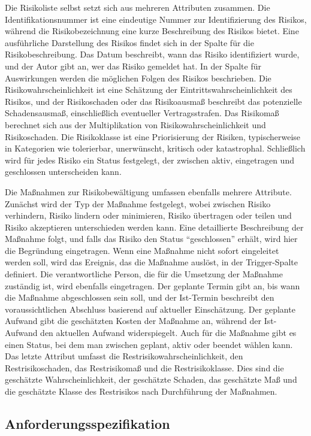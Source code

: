 Die Risikoliste selbst setzt sich aus mehreren Attributen zusammen. Die Identifikationsnummer ist eine eindeutige 
Nummer zur Identifizierung des Risikos, während die Risikobezeichnung eine kurze Beschreibung des Risikos bietet. 
Eine ausführliche Darstellung des Risikos findet sich in der Spalte für die Risikobeschreibung. Das Datum beschreibt, 
wann das Risiko identifiziert wurde, und der Autor gibt an, wer das Risiko gemeldet hat. In der Spalte für Auswirkungen 
werden die möglichen Folgen des Risikos beschrieben. Die Risikowahrscheinlichkeit ist eine Schätzung der 
Eintrittswahrscheinlichkeit des Risikos, und der Risikoschaden oder das Risikoausmaß beschreibt das potenzielle 
Schadensausmaß, einschließlich eventueller Vertragsstrafen. Das Risikomaß berechnet sich aus der Multiplikation von 
Risikowahrscheinlichkeit und Risikoschaden. Die Risikoklasse ist eine Priorisierung der Risiken, typischerweise in 
Kategorien wie tolerierbar, unerwünscht, kritisch oder katastrophal. Schließlich wird für jedes Risiko ein Status 
festgelegt, der zwischen aktiv, eingetragen und geschlossen unterscheiden kann.

Die Maßnahmen zur Risikobewältigung umfassen ebenfalls mehrere Attribute. Zunächst wird der Typ der Maßnahme festgelegt, 
wobei zwischen Risiko verhindern, Risiko lindern oder minimieren, Risiko übertragen oder teilen und Risiko akzeptieren 
unterschieden werden kann. Eine detaillierte Beschreibung der Maßnahme folgt, und falls das Risiko den Status 
``geschlossen'' erhält, wird hier die Begründung eingetragen. Wenn eine Maßnahme nicht sofort eingeleitet werden soll, 
wird das Ereignis, das die Maßnahme auslöst, in der Trigger-Spalte definiert. Die verantwortliche Person, die für 
die Umsetzung der Maßnahme zuständig ist, wird ebenfalls eingetragen. Der geplante Termin gibt an, bis wann die 
Maßnahme abgeschlossen sein soll, und der Ist-Termin beschreibt den voraussichtlichen Abschluss basierend auf 
aktueller Einschätzung. Der geplante Aufwand gibt die geschätzten Kosten der Maßnahme an, während der Ist-Aufwand 
den aktuellen Aufwand widerspiegelt. Auch für die Maßnahme gibt es einen Status, bei dem man zwischen geplant, aktiv 
oder beendet wählen kann. Das letzte Attribut umfasst die Restrisikowahrscheinlichkeit, den Restrisikoschaden, das 
Restrisikomaß und die Restrisikoklasse. Dies sind die geschätzte Wahrscheinlichkeit, der geschätzte Schaden, das 
geschätzte Maß und die geschätzte Klasse des Restrisikos nach Durchführung der Maßnahmen.

\subsection{Anforderungsspezifikation}  \label{Anforderungsspezifikation}

